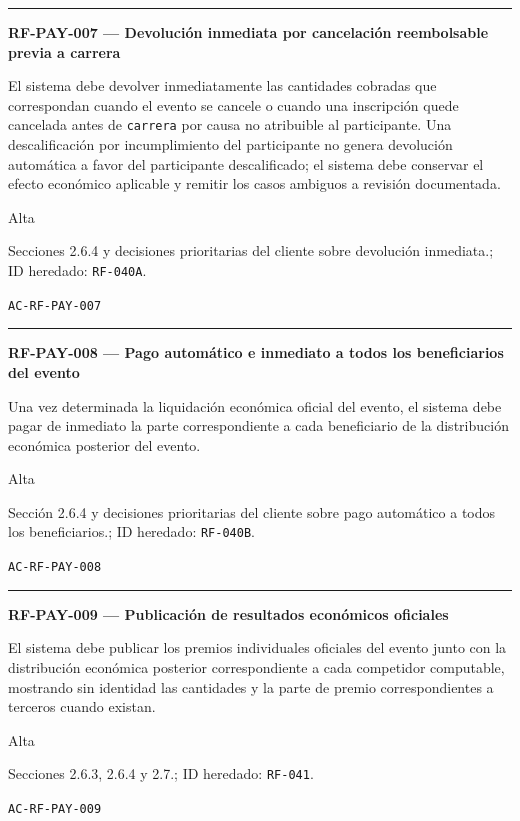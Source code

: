 \documentclass[10pt,letterpaper]{article}
\begin{document}
\vspace{0.25em}\hrule\vspace{0.65em}
\noindent\textbf{RF-PAY-007 --- Devolución inmediata por cancelación reembolsable previa a carrera}\par
\begin{description}[style=nextline,leftmargin=3.15cm,labelwidth=2.8cm,font=\normalfont\bfseries]
\item[Obligación] El sistema debe devolver inmediatamente las cantidades cobradas que correspondan cuando el evento se cancele o cuando una inscripción quede cancelada antes de \texttt{carrera} por causa no atribuible al participante. Una descalificación por incumplimiento del participante no genera devolución automática a favor del participante descalificado; el sistema debe conservar el efecto económico aplicable y remitir los casos ambiguos a revisión documentada.
\item[Prioridad] Alta
\item[Procedencia] Secciones 2.6.4 y decisiones prioritarias del cliente sobre devolución inmediata.; ID heredado: \texttt{RF-040A}.
\item[Verificación] \texttt{AC-RF-PAY-007}
\end{description}
\vspace{0.25em}\hrule\vspace{0.65em}
\noindent\textbf{RF-PAY-008 --- Pago automático e inmediato a todos los beneficiarios del evento}\par
\begin{description}[style=nextline,leftmargin=3.15cm,labelwidth=2.8cm,font=\normalfont\bfseries]
\item[Obligación] Una vez determinada la liquidación económica oficial del evento, el sistema debe pagar de inmediato la parte correspondiente a cada beneficiario de la distribución económica posterior del evento.
\item[Prioridad] Alta
\item[Procedencia] Sección 2.6.4 y decisiones prioritarias del cliente sobre pago automático a todos los beneficiarios.; ID heredado: \texttt{RF-040B}.
\item[Verificación] \texttt{AC-RF-PAY-008}
\end{description}
\vspace{0.25em}\hrule\vspace{0.65em}
\noindent\textbf{RF-PAY-009 --- Publicación de resultados económicos oficiales}\par
\begin{description}[style=nextline,leftmargin=3.15cm,labelwidth=2.8cm,font=\normalfont\bfseries]
\item[Obligación] El sistema debe publicar los premios individuales oficiales del evento junto con la distribución económica posterior correspondiente a cada competidor computable, mostrando sin identidad las cantidades y la parte de premio correspondientes a terceros cuando existan.
\item[Prioridad] Alta
\item[Procedencia] Secciones 2.6.3, 2.6.4 y 2.7.; ID heredado: \texttt{RF-041}.
\item[Verificación] \texttt{AC-RF-PAY-009}
\end{description}
\end{document}
